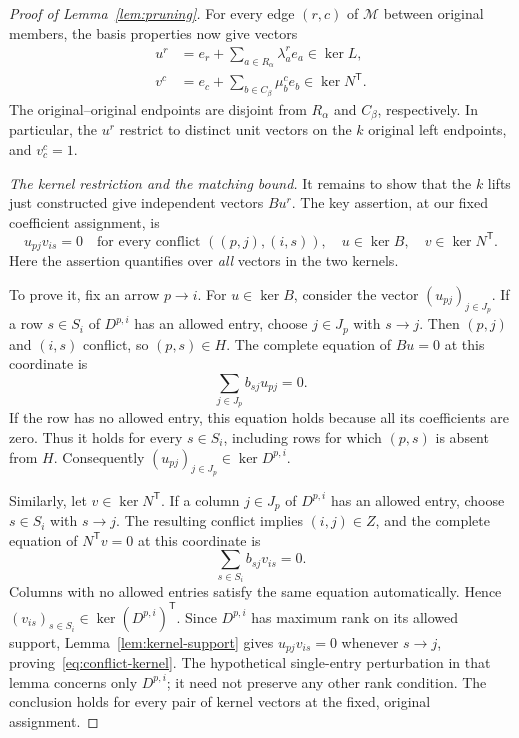 \documentclass[11pt]{article}
\theoremstyle{remark}
\begin{document}
\begin{proof}[Proof of Lemma~\ref{lem:pruning}]
For every edge $(r,c)$ of $\mathcal M$ between original members, the
basis properties now give vectors
\begin{equation}\label{eq:pruning-lifts}
 \begin{aligned}
 u^r&=e_r+\sum_{a\in R_\alpha}\lambda_a^r e_a
                 \in\ker L,\\
 v^c&=e_c+\sum_{b\in C_\beta}\mu_b^c e_b
                 \in\ker N^{\mathsf T}.
 \end{aligned}
\end{equation}
The original--original endpoints are disjoint from $R_\alpha$ and
$C_\beta$, respectively.  In particular, the $u^r$ restrict to distinct
unit vectors on the $k$ original left endpoints, and $v^c_c=1$.

\medskip\noindent
\emph{The kernel restriction and the matching bound.}
It remains to show that the $k$ lifts just constructed give independent
vectors $Bu^r$. The key assertion, at our fixed coefficient assignment, is
\begin{equation}\label{eq:conflict-kernel}
 u_{pj}v_{is}=0
 \quad\text{for every conflict }((p,j),(i,s)),
 \quad u\in\ker B,\quad v\in\ker N^{\mathsf T}.
\end{equation}
Here the assertion quantifies over \emph{all} vectors in the two kernels.

To prove it, fix an arrow $p\to i$.  For $u\in\ker B$, consider the
vector $(u_{pj})_{j\in J_p}$.  If a row $s\in S_i$ of $D^{p,i}$ has
an allowed entry, choose $j\in J_p$ with $s\to j$.  Then
$(p,j)$ and $(i,s)$ conflict, so $(p,s)\in H$.  The complete equation
of $Bu=0$ at this coordinate is
\begin{equation}\label{eq:pruning-row-equation}
 \sum_{j\in J_p}b_{sj}u_{pj}=0.
\end{equation}
If the row has no allowed entry, this equation holds because all its
coefficients are zero.  Thus it holds for every $s\in S_i$, including
rows for which $(p,s)$ is absent from $H$.  Consequently
$(u_{pj})_{j\in J_p}\in\ker D^{p,i}$.

Similarly, let $v\in\ker N^{\mathsf T}$.  If a column $j\in J_p$
of $D^{p,i}$ has an allowed entry, choose $s\in S_i$ with $s\to j$.
The resulting conflict implies $(i,j)\in Z$, and the complete equation
of $N^{\mathsf T}v=0$ at this coordinate is
\begin{equation}\label{eq:pruning-column-equation}
 \sum_{s\in S_i}b_{sj}v_{is}=0.
\end{equation}
Columns with no allowed entries satisfy the same equation
automatically.  Hence $(v_{is})_{s\in S_i}\in\ker(D^{p,i})^{\mathsf T}$.
Since $D^{p,i}$ has maximum rank on its allowed support,
Lemma~\ref{lem:kernel-support} gives $u_{pj}v_{is}=0$ whenever
$s\to j$, proving~\eqref{eq:conflict-kernel}.
The hypothetical single-entry perturbation in that lemma concerns only
$D^{p,i}$; it need not preserve any other rank condition.  The conclusion
holds for every pair of kernel vectors at the fixed, original assignment.


\end{proof}
\end{document}
